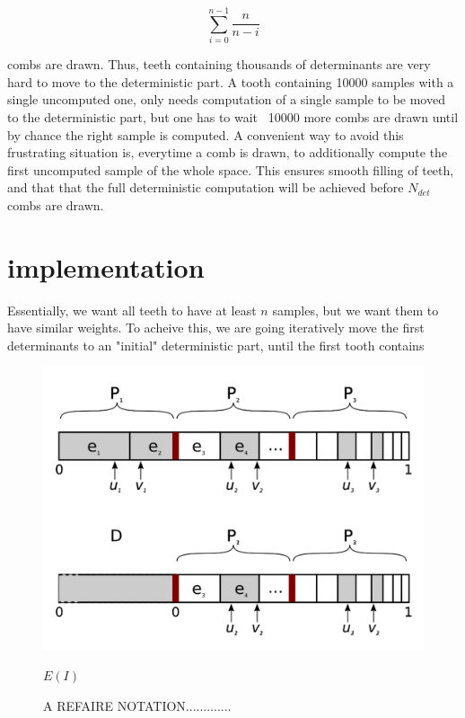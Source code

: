 \documentclass[./thesis.tex]{subfiles}
\begin{document}
$$\sum_{i=0}^{n-1} \frac{n}{n-i}$$

combs are drawn. Thus, teeth containing thousands of determinants are very hard to move to the deterministic part. A tooth containing 10000 samples with a single uncomputed one, only needs computation of a single sample to be moved to the deterministic part, but one has to wait ~10000 more combs are drawn until by chance the right sample is computed.
A convenient way to avoid this frustrating situation is, everytime a comb is drawn, to additionally compute the first uncomputed sample of the whole space. This ensures smooth filling of teeth, and that that the full deterministic computation will be achieved before $N_{det}$ combs are drawn.

\section{implementation}


Essentially, we want all teeth to have at least $n$ samples, but we want them to have similar weights. To acheive this, we are going iteratively move the first determinants to an "initial" deterministic part, until the first tooth contains 





\begin{figure}[h!]
	\begin{center}
		\includegraphics[width=0.9\columnwidth]{figures/pt2/move_to_deterministic}
		\caption{A REFAIRE NOTATION.............}
		\label{fig:move_to_deterministic}
		$E(I)$
	\end{center}
\end{figure}
\end{document}
